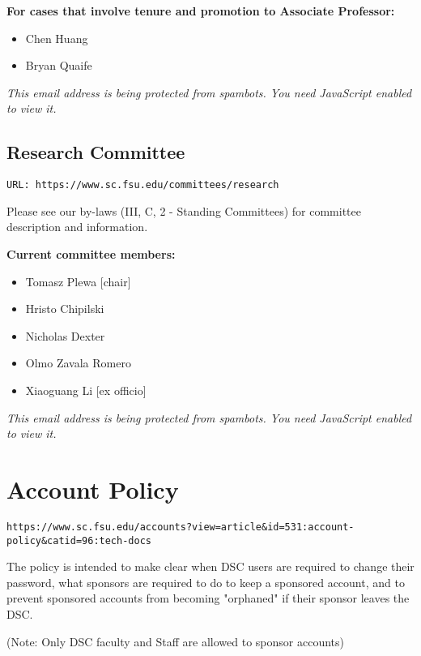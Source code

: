 \documentclass[12pt,a4paper]{article}
\begin{document}
\textbf{For cases that involve tenure and promotion to Associate Professor:}
\begin{itemize}
    \item Chen Huang
    \item Bryan Quaife
\end{itemize}

\textit{This email address is being protected from spambots. You need JavaScript enabled to view it.}

\subsection{Research Committee}
\texttt{URL: https://www.sc.fsu.edu/committees/research}

Please see our by-laws (III, C, 2 - Standing Committees) for committee description and information.

\textbf{Current committee members:}
\begin{itemize}
    \item Tomasz Plewa [chair]
    \item Hristo Chipilski
    \item Nicholas Dexter
    \item Olmo Zavala Romero
    \item Xiaoguang Li [ex officio]
\end{itemize}

\textit{This email address is being protected from spambots. You need JavaScript enabled to view it.}

\section{Account Policy}
\texttt{https://www.sc.fsu.edu/accounts?view=article\&id=531:account-policy\&catid=96:tech-docs}

The policy is intended to make clear when DSC users are required to change their password, what sponsors are required to do to keep a sponsored account, and to prevent sponsored accounts from becoming "orphaned" if their sponsor leaves the DSC.

(Note: Only DSC faculty and Staff are allowed to sponsor accounts)
\end{document}
